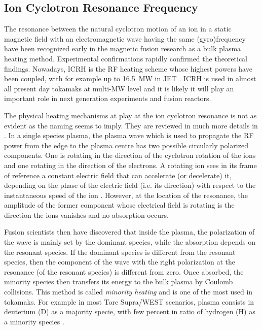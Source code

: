 \subsection{Ion Cyclotron Resonance Frequency}
The resonance between the natural cyclotron motion of an ion in a static magnetic field with an electromagnetic wave having the same (gyro)frequency have been recognized early in the magnetic fusion research as a bulk plasma heating method. Experimental confirmations rapidly confirmed the theoretical findings. Nowadays, ICRH is the RF heating scheme whose highest powers have been coupled, with for example up to 16.5~\si{MW} in JET . ICRH is used in almost all present day tokamaks at multi-\si{MW} level and it is likely it will  play an important role in next generation experiments and fusion reactors.


The physical heating mechanisms at play at the ion cyclotron resonance is not as evident as the naming seems to imply. They are reviewed in much more details in . In a single species plasma, the plasma wave which is used to propagate the RF power from the edge to the plasma centre has two possible circularly polarized components. One is rotating in the direction of the cyclotron rotation of the ions and one rotating in the direction of the electrons. A rotating ion sees in its frame of reference a constant electric field that can accelerate (or decelerate) it, depending on the phase of the electric field (i.e. its direction) with respect to the instantaneous speed of the ion . However, at the location of the resonance, the amplitude of the former component whose electrical field is rotating is the direction the ions vanishes and no absorption occurs. 

Fusion scientists then have discovered that inside the plasma, the polarization of the wave is mainly set by the dominant species, while the absorption depends on the resonant species. If the dominant species is different from the resonant species, then the component of the wave with the right polarization at the resonance (of the resonant species) is different from zero. Once absorbed, the minority species then transfers its energy to the bulk plasma by Coulomb collisions. This method is called \textit{minority heating}  and is one of the most used in tokamaks\cite{jacquinot1999}. For example in most Tore Supra/WEST scenarios, plasma consists in deuterium (D) as a majority specie, with few percent in ratio of hydrogen (H) as a minority species . 

